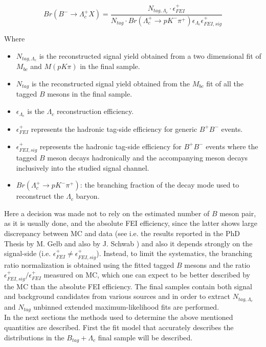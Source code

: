 \begin{equation}
    Br(B^- \rightarrow \Lambda_c^+ X) = \frac{ N_{tag, \Lambda_c} \cdot  \epsilon^{+}_{FEI}}{N_{tag} \cdot Br(\Lambda_c^+ \rightarrow  p K^- \pi^+) \epsilon_{\Lambda_c} \epsilon^{+}_{FEI,  sig }}
\end{equation}\label{eq:BRformula}

Where 
\begin{itemize}

\item $N_{tag, \Lambda_c} $ is the reconstructed signal yield obtained from a two dimensional fit of $M_{bc}$ and $M(p K \pi)$ in the final sample.
\item ${N_{tag}}$ is the reconstructed signal yield obtained from the $M_{bc}$ fit of all the tagged $B$ mesons in the final sample.
\item $\epsilon_{\Lambda_c} $ is the $\Lambda_c$ reconstruction efficiency.
\item $\epsilon^{+}_{FEI}$ represents the hadronic tag-side efficiency for generic $B^+B^- $ events. 
\item $\epsilon^{+}_{FEI,  sig}$ represents the hadronic tag-side efficiency for  $B^+B^-$ events where the tagged $B$ meson decays hadronically and the accompanying meson decays inclusively into the studied signal channel. 
\item  $Br(\Lambda_c^+ \rightarrow  p K^- \pi^+) $: the branching fraction of the decay mode used to reconstruct the  $\Lambda_c$ baryon.
\end{itemize}
\vspace{0.2 cm}
Here a decision was made not to rely on the estimated number of $B$ meson pair, as it is usually done, and the absolute FEI efficiency, since the latter shows large discrepancy between MC and data (see i.e. the results reported in the PhD Thesis by M. Gelb \cite{gelb_moritz_2018_21546} and also by J. Schwab \cite{schwab_judith_2017_21422} ) and also it depends strongly on the signal-side (i.e. $\epsilon^{+}_{FEI} \neq \epsilon^{+}_{FEI,  sig}$). 
Instead, to limit the systematics, the branching ratio normalization is obtained using the fitted tagged $B$ mesons and the ratio $\epsilon^{+}_{FEI,  sig} / \epsilon^{+}_{FEI}$ measured on MC, 
which one can expect to be better  described by the MC than the absolute FEI efficiency.
The final samples contain both signal and background candidates
from various sources and in order to extract $N_{tag, \Lambda_c} $ and ${N_{tag}}$  unbinned extended maximum-likelihood fits are performed.  \\
In the next sections the methods used to determine the above mentioned quantities are described. First the fit model that accurately describes the   distributions in the $B_{tag}+\Lambda_c$ final sample will be described.

